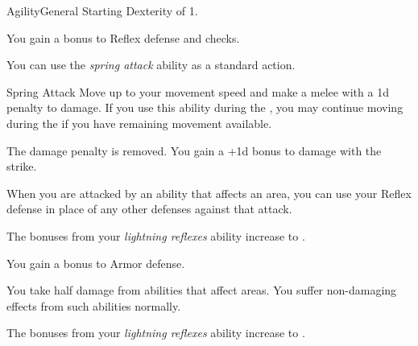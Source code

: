     \begin{feat}{Agility}{General}
        \featpre Starting Dexterity of 1.

         You gain a  bonus to Reflex defense and  checks.

         You can use the \textit{spring attack} ability as a standard action.
        \begin{freeability}{Spring Attack}
            Move up to your movement speed and make a melee  with a \minus1d penalty to damage.
            If you use this ability during the , you may continue moving during the  if you have remaining movement available.

            \rankline
             The damage penalty is removed.
             You gain a +1d bonus to damage with the strike.
        \end{freeability}

         When you are attacked by an ability that affects an area, you can use your Reflex defense in place of any other defenses against that attack.

         The bonuses from your \textit{lightning reflexes} ability increase to .

         You gain a  bonus to Armor defense.

         You take half damage from abilities that affect areas.
        You suffer non-damaging effects from such abilities normally.

         The bonuses from your \textit{lightning reflexes} ability increase to .
    \end{feat}

